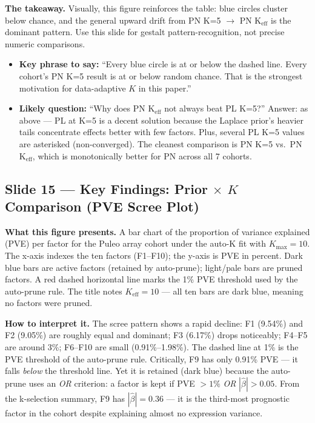 \documentclass[11pt]{article}
\newcommand{\sectionlabel}[1]{\textbf{#1}}
\begin{document}
\textbf{The takeaway.} Visually, this figure reinforces the table: blue circles cluster below chance, and the general upward drift from PN K=5 $\to$ PN K$_\text{eff}$ is the dominant pattern. Use this slide for gestalt pattern-recognition, not precise numeric comparisons.

\begin{itemize}
  \item \sectionlabel{Key phrase to say:} ``Every blue circle is at or below the dashed line. Every cohort's PN K=5 result is at or below random chance. That is the strongest motivation for data-adaptive $K$ in this paper.''
  \item \sectionlabel{Likely question:} ``Why does PN K$_\text{eff}$ not always beat PL K=5?'' Answer: as above --- PL at K=5 is a decent solution because the Laplace prior's heavier tails concentrate effects better with few factors. Plus, several PL K=5 values are asterisked (non-converged). The cleanest comparison is PN K=5 vs.\ PN K$_\text{eff}$, which is monotonically better for PN across all 7 cohorts.
\end{itemize}

\subsection*{Slide 15 --- Key Findings: Prior $\times$ $K$ Comparison (PVE Scree Plot)}

\textbf{What this figure presents.} A bar chart of the proportion of variance explained (PVE) per factor for the Puleo array cohort under the auto-K fit with $K_\text{max} = 10$. The x-axis indexes the ten factors (F1--F10); the y-axis is PVE in percent. Dark blue bars are active factors (retained by auto-prune); light/pale bars are pruned factors. A red dashed horizontal line marks the 1\% PVE threshold used by the auto-prune rule. The title notes $K_\text{eff} = 10$ --- all ten bars are dark blue, meaning no factors were pruned.

\textbf{How to interpret it.} The scree pattern shows a rapid decline: F1 (9.54\%) and F2 (9.05\%) are roughly equal and dominant; F3 (6.17\%) drops noticeably; F4--F5 are around 3\%; F6--F10 are small (0.91\%--1.98\%). The dashed line at 1\% is the PVE threshold of the auto-prune rule. Critically, F9 has only 0.91\% PVE --- it falls \emph{below} the threshold line. Yet it is retained (dark blue) because the auto-prune uses an \emph{OR} criterion: a factor is kept if PVE $> 1\%$ \emph{OR} $|\hat{\beta}| > 0.05$. From the k-selection summary, F9 has $|\hat{\beta}| = 0.36$ --- it is the third-most prognostic factor in the cohort despite explaining almost no expression variance.
\end{document}

